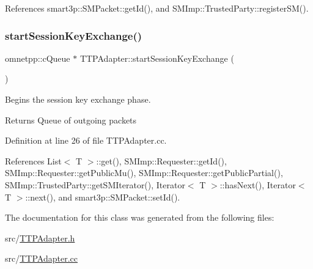 References smart3p\+::\+S\+M\+Packet\+::get\+Id(), and S\+M\+Imp\+::\+Trusted\+Party\+::register\+S\+M().

\mbox{\label{classTTPAdapter_a1e5405c3ac74693b2a542dd72ad44012}} 
\subsubsection{\texorpdfstring{start\+Session\+Key\+Exchange()}{startSessionKeyExchange()}}
{\footnotesize\ttfamily omnetpp\+::c\+Queue $\ast$ T\+T\+P\+Adapter\+::start\+Session\+Key\+Exchange (\begin{DoxyParamCaption}{ }\end{DoxyParamCaption})}

Begins the session key exchange phase. \begin{DoxyReturn}{Returns}
Queue of outgoing packets 
\end{DoxyReturn}


Definition at line 26 of file T\+T\+P\+Adapter.\+cc.



References List$<$ T $>$\+::get(), S\+M\+Imp\+::\+Requester\+::get\+Id(), S\+M\+Imp\+::\+Requester\+::get\+Public\+Mu(), S\+M\+Imp\+::\+Requester\+::get\+Public\+Partial(), S\+M\+Imp\+::\+Trusted\+Party\+::get\+S\+M\+Iterator(), Iterator$<$ T $>$\+::has\+Next(), Iterator$<$ T $>$\+::next(), and smart3p\+::\+S\+M\+Packet\+::set\+Id().



The documentation for this class was generated from the following files\+:\begin{DoxyCompactItemize}
\item 
src/\hyperlink{TTPAdapter_8h}{T\+T\+P\+Adapter.\+h}\item 
src/\hyperlink{TTPAdapter_8cc}{T\+T\+P\+Adapter.\+cc}\end{DoxyCompactItemize}
